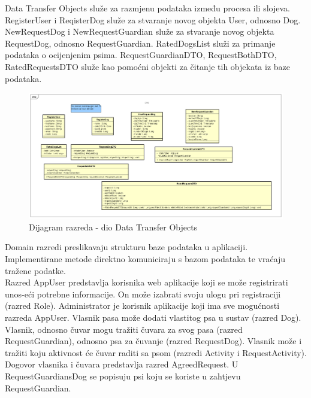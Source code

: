 		
			Data Transfer Objects služe za razmjenu podataka između procesa ili slojeva.
			RegisterUser i ReqisterDog služe za stvaranje novog objekta User, odnosno Dog.
			NewRequestDog i NewRequestGuardian služe za stvaranje novog objekta RequestDog, odnosno RequestGuardian.
			RatedDogsList služi za primanje podataka o ocijenjenim psima.
			RequestGuardianDTO, RequestBothDTO, RatedRequestsDTO služe kao pomoćni objekti za čitanje tih objekata iz baze podataka.
			\eject
			
			\begin{figure}[htb]
				\centering
				\includegraphics[width=15cm]{slike/Dijagram razreda - DTO}
				\caption{Dijagram razreda - dio Data Transfer Objects}
				\label{fig:Class-Diagram}
			\end{figure}
		
		
			Domain razredi preslikavaju strukturu baze podataka u aplikaciji. Implementirane metode direktno komuniciraju s bazom podataka te vraćaju tražene podatke.\\
			Razred AppUser predstavlja korisnika web aplikacije koji se može registrirati unos-eći potrebne informacije. On može izabrati svoju ulogu pri registraciji (razred Role). Administrator je korisnik aplikacije koji ima sve mogućnosti razreda AppUser. Vlasnik pasa može dodati vlastitog psa u sustav (razred Dog). Vlasnik, odnosno čuvar mogu tražiti čuvara za svog pasa (razred RequestGuardian), odnosno psa za čuvanje (razred RequestDog). Vlasnik može i tražiti koju aktivnost će čuvar raditi sa psom (razredi Activity i RequestActivity). Dogovor vlasnika i čuvara predstavlja razred AgreedRequest. U RequestGuardiansDog se popisuju psi koju se koriste u zahtjevu RequestGuardian.
			
